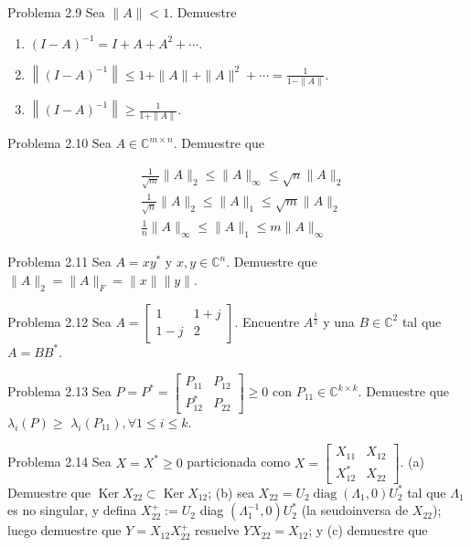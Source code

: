 Problema 2.9 Sea $\|A\|<1$. Demuestre

\begin{enumerate}
  \item $(I-A)^{-1}=I+A+A^{2}+\cdots$.
  \item $\left\|(I-A)^{-1}\right\| \leq 1+\|A\|+\|A\|^{2}+\cdots=\frac{1}{1-\|A\|}$.
  \item $\left\|(I-A)^{-1}\right\| \geq \frac{1}{1+\|A\|}$.
\end{enumerate}

Problema 2.10 Sea $A \in \mathbb{C}^{m \times n}$. Demuestre que

$$
\begin{aligned}
& \frac{1}{\sqrt{m}}\|A\|_{2} \leq\|A\|_{\infty} \leq \sqrt{n}\|A\|_{2} \\
& \frac{1}{\sqrt{n}}\|A\|_{2} \leq\|A\|_{1} \leq \sqrt{m}\|A\|_{2} \\
& \frac{1}{n}\|A\|_{\infty} \leq\|A\|_{1} \leq m\|A\|_{\infty}
\end{aligned}
$$

Problema 2.11 Sea $A=x y^{*}$ y $x, y \in \mathbb{C}^{n}$. Demuestre que $\|A\|_{2}=\|A\|_{F}=\|x\|\|y\|$.

Problema 2.12 Sea $A=\left[\begin{array}{cc}1 & 1+j \\ 1-j & 2\end{array}\right]$. Encuentre $A^{\frac{1}{2}}$ y una $B \in \mathbb{C}^{2}$ tal que $A=B B^{*}$.

Problema 2.13 Sea $P=P^{*}=\left[\begin{array}{ll}P_{11} & P_{12} \\ P_{12}^{*} & P_{22}\end{array}\right] \geq 0$ con $P_{11} \in \mathbb{C}^{k \times k}$. Demuestre que $\lambda_{i}(P) \geq$ $\lambda_{i}\left(P_{11}\right), \forall 1 \leq i \leq k$.

Problema 2.14 Sea $X=X^{*} \geq 0$ particionada como $X=\left[\begin{array}{ll}X_{11} & X_{12} \\ X_{12}^{*} & X_{22}\end{array}\right]$. (a) Demuestre que $\operatorname{Ker} X_{22} \subset \operatorname{Ker} X_{12}$; (b) sea $X_{22}=U_{2} \operatorname{diag}\left(\Lambda_{1}, 0\right) U_{2}^{*}$ tal que $\Lambda_{1}$ es no singular, y defina $X_{22}^{+}:=U_{2}$ diag $\left(\Lambda_{1}^{-1}, 0\right) U_{2}^{*}$ (la seudoinversa de $X_{22}$); luego demuestre que $Y=X_{12} X_{22}^{+}$ resuelve $Y X_{22}=X_{12}$; y (c) demuestre que

